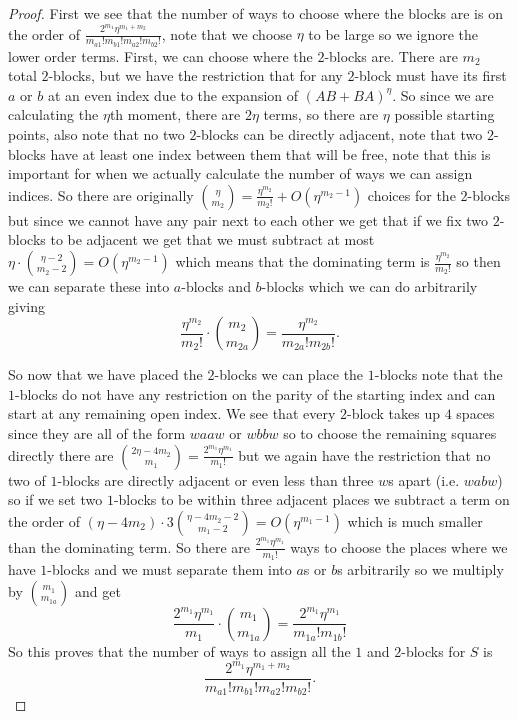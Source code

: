 \documentclass[12pt,reqno]{amsart}
\theoremstyle{plain} %
\theoremstyle{remark}
\theoremstyle{definition}
\begin{document}
\begin{proof}
First we see that the number of ways to choose where the blocks are is on the order of $\frac{2^{m_1}\eta^{m_1+m_2}}{m_{a1}!m_{b1}!m_{a2}!m_{b2}!}$, note that we choose $\eta$ to be large so we ignore the lower order terms. First, we can choose where the $2$-blocks are. There are $m_2$ total $2$-blocks, but we have the restriction that for any $2$-block must have its first $a$ or $b$ at an even index due to the expansion of $(AB+BA)^\eta$. So since we are calculating the $\eta$th moment, there are $2\eta$ terms, so there are $\eta$ possible starting points, also note that no two $2$-blocks can be directly adjacent, note that two $2$-blocks have at least one index between them that will be free, note that this is important for when we actually calculate the number of ways we can assign indices. So there are originally $\binom{\eta}{m_2}=\frac{\eta^{m_2}}{m_2!}+O(\eta^{m_2-1})$ choices for the $2$-blocks but since we cannot have any pair next to each other we get that if we fix two $2$-blocks to be adjacent we get that we must subtract at most $\eta\cdot \binom{\eta-2}{m_2-2}=O(\eta^{m_2-1})$ which means that the dominating term is $\frac{\eta^{m_2}}{m_2!}$ so then we can separate these into $a$-blocks and $b$-blocks which we can do arbitrarily giving \[\frac{\eta^{m_2}}{m_2!}\cdot\binom{m_2}{m_{2a}}=\frac{\eta^{m_2}}{m_{2a}!m_{2b}!}.\]

So now that we have placed the $2$-blocks we can place the $1$-blocks note that the $1$-blocks do not have any restriction on the parity of the starting index and can start at any remaining open index. We see that every $2$-block takes up $4$ spaces since they are all of the form $waaw$ or $wbbw$ so to choose the remaining squares directly there are $\binom{2\eta-4m_2}{m_1}=\frac{2^{m_1}\eta^{m_1}}{m_1!}$ but we again have the restriction that no two of $1$-blocks are directly adjacent or even less than three $w$s apart (i.e. $wabw$) so if we set two $1$-blocks to be within three adjacent places we subtract a term on the order of $(\eta-4m_2)\cdot 3\binom{\eta-4m_2-2}{m_1-2}=O(\eta^{m_1-1})$ which is much smaller than the dominating term. So there are $\frac{2^{m_1}\eta^{m_1}}{m_1!}$ ways to choose the places where we have $1$-blocks and we must separate them into $a$s or $b$s arbitrarily so we multiply by $\binom{m_1}{m_{1a}}$ and get 
\[
\frac{2^{m_1}\eta^{m_1}}{m_1}\cdot \binom{m_1}{m_{1a}}=\frac{2^{m_1}\eta^{m_1}}{m_{1a}!m_{1b}!}
\]
So this proves that the number of ways to assign all the $1$ and $2$-blocks for $S$ is 
\[
\frac{2^{m_1}\eta^{m_1+m_2}}{m_{a1}!m_{b1}!m_{a2}!m_{b2}!}.
\]
 

\end{proof}
\end{document}
